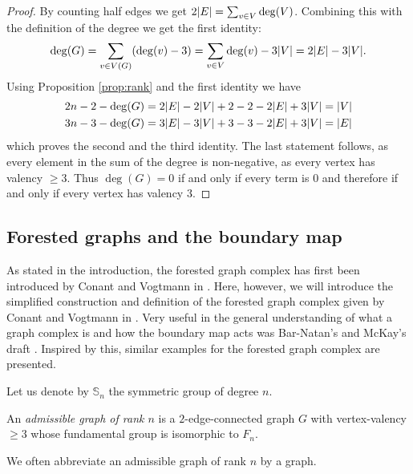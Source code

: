 \begin{proof}
	By counting half edges we get $2 \abs{E} = \sum_{v \in V} \deg(V)$.
	Combining this with the definition of the degree we get the first identity:
	\[
		\deg(G) = \sum_{v \in V(G)} (\deg(v) - 3) = \sum_{v \in V} \deg(v) - 3 \abs{V} = 2  \abs{E} - 3 \abs{V}
	.\] 
	Using Proposition \ref{prop:rank} and the first identity we have
	\begin{align*}
		2 n -2 - \deg(G) &= 2 \abs{E} - 2 \abs{V} + 2 - 2 - 2\abs{E} + 3 \abs{V} = \abs{V}\\
		3 n -3 - \deg(G) &= 3 \abs{E} - 3 \abs{V} + 3 - 3 - 2\abs{E} + 3 \abs{V} = \abs{E}
	\end{align*}
	which proves the second and the third identity. The last statement follows, as every element in the sum of the degree is non-negative, as every vertex has valency $\geq 3$.
	Thus $\deg(G) = 0$ if and only if every term is $0$ and therefore if and only if every vertex has valency $3$.
\end{proof}

\subsection{Forested graphs and the boundary map}
\label{sec:ForestedGraphBoundary}
As stated in the introduction, the forested graph complex has first been introduced by Conant and Vogtmann in \cite{conant03}.
Here, however, we will introduce the simplified construction and definition of the forested graph complex given by Conant and Vogtmann in \cite{conant08}.
Very useful in the general understanding of  what a graph complex is and how the boundary map acts was Bar-Natan's and McKay's draft \cite{natan01}.
Inspired by this, similar examples for the forested graph complex are presented.

Let us denote by $\mathbb{S}_{n}$ the symmetric group of degree $n$.
\begin{definition}
	An \emph{admissible graph of rank $n$} is a $2$-edge-connected graph $G$ with vertex-valency $\geq 3$ whose fundamental group is isomorphic to $F_{n}$.
\end{definition}

We often abbreviate an admissible graph of rank $n$ by a graph.

